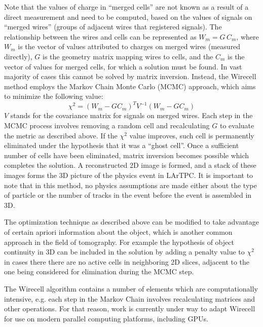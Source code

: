 \documentclass[a4paper]{jpconf}
\begin{document}
Note that the values of  charge in ``merged cells'' are not known as a result of a direct measurement and need to be computed, based
on the values of signals on ``merged wires'' (groups of adjacent wires that registered signals).
The relationship between the wires and cells  can be represented as $W_m=G$\,$C_m$, where $W_m$ is the vector of
values attributed to charges on merged wires (measured directly), $G$ is the geometry matrix mapping wires to cells,
and the $C_m$ is the vector of values for merged cells, for which a solution must be found. In vast majority
of cases this cannot be solved by matrix inversion. Instead, the Wirecell method employs the Markov Chain Monte Carlo (MCMC) approach, which aims
to minimize the following value:
$$\chi^2=(W_m-GC_m)^TV^{-1}(W_m-GC_m)$$
$V$ stands for the covariance matrix for signals on merged wires.
Each step in the MCMC process involves removing a random cell and recalculating $G$ to evaluate the metric as described above. If the $\chi^2$ value
improves, such cell is permanently eliminated under the hypothesis that it was a ``ghost cell''. Once a sufficient number of cells have been eliminated,
matrix inversion becomes possible which completes the solution. A reconstructed 2D image is formed, and a stack of these images forms the 3D
picture of the physics event in LArTPC. It is important to note that in this method, no physics assumptions are made either about the type of particle
or the number of tracks in the event before the event is assembled in 3D.
  

The optimization technique as described above can be modified to take advantage of certain apriori information about the object, which is another common
approach in the field of tomography. For example the hypothesis of object continuity in 3D can be included in the solution by adding a penalty
value to $\chi^2$ in cases there there are no active cells in neighboring 2D slices, adjacent to the one being considered for elimination during the MCMC step.

The Wirecell algorithm contains a number of elements which are computationally intensive, e.g. each step in the Markov Chain involves recalculating
matrices and other operations. For that reason, work is currently under way to adapt Wirecell for use on modern parallel computing platforms,
including GPUs.
\end{document}
